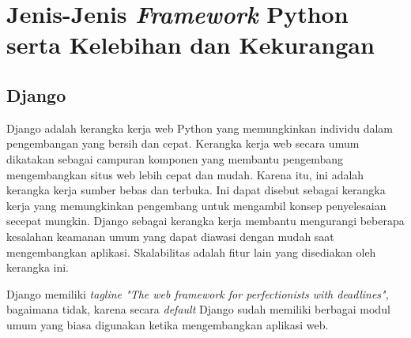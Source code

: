 \section{Jenis-Jenis \textit{Framework} Python serta Kelebihan dan Kekurangan}

\subsection{Django}

Django adalah kerangka kerja web Python yang memungkinkan individu dalam pengembangan yang bersih dan cepat. Kerangka kerja web secara umum dikatakan sebagai campuran komponen yang membantu pengembang mengembangkan situs web lebih cepat dan mudah. Karena itu, ini adalah kerangka kerja sumber bebas dan terbuka. Ini dapat disebut sebagai kerangka kerja yang memungkinkan pengembang untuk mengambil konsep penyelesaian secepat mungkin. Django sebagai kerangka kerja membantu mengurangi beberapa kesalahan keamanan umum yang dapat diawasi dengan mudah saat mengembangkan aplikasi. Skalabilitas adalah fitur lain yang disediakan oleh kerangka ini.

Django memiliki \textit{tagline "The web framework for perfectionists with deadlines"}, bagaimana tidak, karena secara \textit{default} Django sudah memiliki berbagai modul umum yang biasa digunakan ketika mengembangkan aplikasi web.


